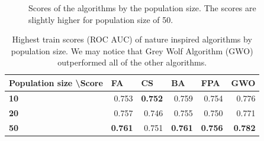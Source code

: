 \documentclass[runningheads]{llncs}
\begin{document}
\begin{figure}
    \centering
    \qquad
    \caption{Scores of the algorithms by the population size. The scores are slightly higher for population size of 50.}
    \label{fig:nia_train_score_by_algorithm}
\end{figure}

\begin{table}[]
	\begin{center}
		\begin{tabular}{|l|rrrrr|}
			\hline
			\textbf{Population size \textbackslash Score} & \multicolumn{1}{l}{\textbf{FA}} & \multicolumn{1}{l}{\textbf{CS}} & \multicolumn{1}{l}{\textbf{BA}} & \multicolumn{1}{l}{\textbf{FPA}} & \multicolumn{1}{l|}{\textbf{GWO}} \\ \hline
			\textbf{10}                                             & 0.753                           & \textbf{0.752}                           & 0.759                           & 0.754                            & 0.776                             \\
			\textbf{20}                                             & 0.757                           & 0.746                           & 0.755                           & 0.750                            & 0.771                             \\
			\textbf{50}                                             & \textbf{0.761}                           & 0.751                           & \textbf{0.761}                           & \textbf{0.756}                            & \textbf{0.782}                             \\ \hline
		\end{tabular}
	\end{center}
	\begin{center}
		\caption{Highest train scores (ROC AUC) of nature inspired algorithms by population size. We may notice that Grey Wolf Algorithm (GWO) outperformed all of the other algorithms.} \label{tab:nia_comparison}
	\end{center}
\end{table}
\end{document}
